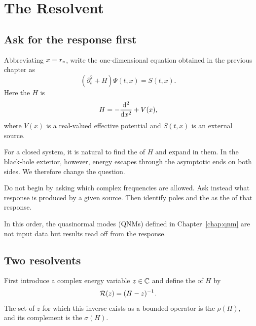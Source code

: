 \chapter{The Resolvent}
\label{chap:resolvent}

\section{Ask for the response first}

Abbreviating $x=r_*$, write the one-dimensional equation obtained in the previous chapter as
\begin{equation}
\left(
\partial_t^2+H
\right)\Psi(t,x)
=
S(t,x).
\label{eq:wave_H_form}
\end{equation}
Here the  $H$ is
\begin{equation}
H
=
-\frac{\mathrm{d}^2}{\mathrm{d} x^2}
+V(x),
\label{eq:H_definition}
\end{equation}
where $V(x)$ is a real-valued effective potential and $S(t,x)$ is an external source.

For a closed system, it is natural to find the  of $H$ and expand in them. In the black-hole exterior, however, energy escapes through the asymptotic ends on both sides. We therefore change the question.

\begin{principlebox}
Do not begin by asking which complex frequencies are allowed. Ask instead what response is produced by a given source. Then identify poles and the  as the  of that response.
\end{principlebox}

In this order, the quasinormal modes (QNMs) defined in Chapter~\ref{chap:qnm} are not input data but results read off from the response.

\section{Two resolvents}

First introduce a complex energy variable $z\in\mathbb{C}$ and define the  of $H$ by
\begin{equation}
\mathcal{R}(z)
=
(H-z)^{-1}.
\label{eq:energy_resolvent}
\end{equation}
The set of $z$ for which this inverse exists as a bounded operator is the  $\rho(H)$, and its complement is the  $\sigma(H)$.

